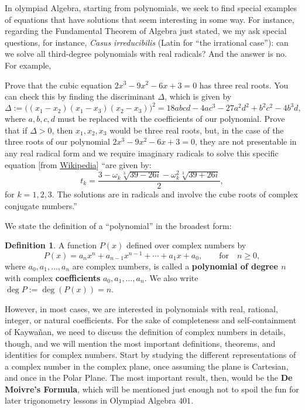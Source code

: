 \documentclass[12pt,a4paper]{memoir}
\theoremstyle{definition}
\newtheorem*{definition}{Definition}
\begin{document}
	
	In olympiad Algebra, starting from polynomials, we seek to find special examples of equations that have solutions that seem interesting in some way. For instance, regarding the Fundamental Theorem of Algebra just stated, we my ask special questions, for instance, \textit{Casus irreducibilis} (Latin for ``the irrational case''): can we solve all third-degree polynomials with real radicals? And the answer is no. For example,
	
	\begin{example}
		Prove that the cubic equation $2x^{3}-9x^{2}-6x+3=0$ has three real roots. You can check this by finding the discriminant $\Delta$, which is given by \[\Delta:={\bigl (}(x_{1}-x_{2})(x_{1}-x_{3})(x_{2}-x_{3}){\bigr )}^{2}=18abcd-4ac^{3}-27a^{2}d^{2}+b^{2}c^{2}-4b^{3}d,\]
		where $a,b,c,d$ must be replaced with the coefficients of our polynomial. Prove that if $\Delta>0$,  then $x_1,x_2,x_3$ would be three real roots, but, in the case of the three roots of our polynomial $2x^{3}-9x^{2}-6x+3=0$, they are not presentable in any real radical form and we require imaginary radicals to solve this specific equation [from \href{https://en.wikipedia.org/wiki/Casus_irreducibilis}{Wikipedia}] ``are given by: 
		\[{\displaystyle t_{k}={\frac {3-\omega _{k}{\sqrt[{3}]{39-26i}}-\omega _{k}^{2}{\sqrt[{3}]{39+26i}}}{2}}},\]
		for $k=1,2,3$. The solutions are in radicals and involve the cube roots of complex conjugate numbers.''
	\end{example}
	
	
	\begin{tcolorbox}[title={Definition of Polynomial and Roots}]
		We state the definition of a ``polynomial'' in the broadest form:
		\begin{definition}
			A function $P(x)$ defined over complex numbers by
			\[P(x)=a_nx^n+a_{n-1}x^{n-1}+\cdots+a_1x+a_0, \qquad \text{for} \quad n \geq 0,\]
			where $a_0,a_1,\dots,a_n$ are complex numbers, is called a \textbf{polynomial of degree $n$} with complex \textbf{coefficients} $a_0,a_1,\dots,a_n$. We also write $\deg P := \deg(P(x)) = n$.
		\end{definition}
	\end{tcolorbox}
	
	However, in most cases, we are interested in polynomials with real, rational, integer, or natural coefficients. For the sake of completeness and self-containment of Kaywañan, we need to discuss the definition of complex numbers in details, though, and we will mention the most important definitions, theorems, and identities for complex numbers. Start by studying the different representations of a complex number in the complex plane, once assuming the plane is Cartesian, and once in the Polar Plane. The most important result, then, would be the \textbf{De Moivre's Formula}, which will be mentioned just enough not to spoil the fun for later trigonometry lessons in Olympiad Algebra $401$.
	
\end{document}
